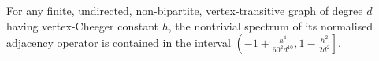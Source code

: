 \begin{theorem}
\label{Thm:Intro}
For any finite, undirected, non-bipartite, vertex-transitive graph of degree $d$ having vertex-Cheeger constant $h$, the nontrivial spectrum of its normalised adjacency operator is contained in the interval $\left(-1 + \frac{h^4}{60^2 d^{10}}, 1- \frac{h^2}{2d^2}\right]$. 
\end{theorem}
